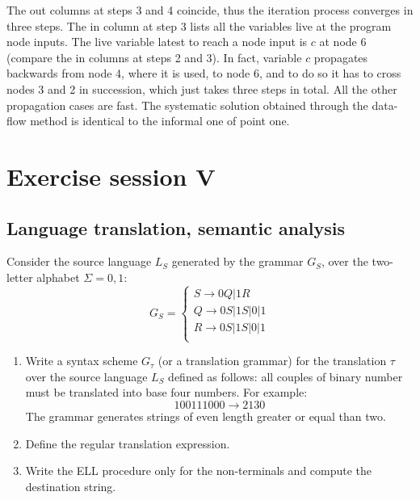 \documentclass[12pt, a4paper]{report}
\begin{document}
\begin{enumerate}
\begin{figure}[H]
                \end{figure} 
                The out columns at steps 3 and 4 coincide, thus the iteration process converges in three steps. The in column at step 3 lists all the variables
                live at the program node inputs. The live variable latest to reach a node input is $c$ at node 6 (compare the in columns at steps 2 and 3). In fact, 
                variable $c$ propagates backwards from node 4, where it is used, to node 6, and to do so it has to cross nodes 3 and 2 in succession, which just takes 
                three steps in total. All the other propagation cases are fast. The systematic solution obtained through the data-flow method is identical to the informal 
                one of point one. 
        \end{enumerate}

\newpage 

\chapter{Exercise session V}
    \section{Language translation, semantic analysis}
        Consider the source language $L_S$ generated by the grammar $G_S$, over the two-letter alphabet $\Sigma= {0,1}$:
        \[G_S=\begin{cases}
            S \rightarrow 0Q|1R     \\
            Q \rightarrow 0S|1S|0|1 \\
            R \rightarrow 0S|1S|0|1 \\
        \end{cases}\]
        \begin{enumerate}
            \item Write a syntax scheme $G_{\tau}$ (or a translation grammar) for the translation $\tau$ over the source language $L_S$ defined as follows: 
                all couples of binary number must be translated into base four numbers. For example: 
                \[100111000 \rightarrow 2130\]
                The grammar generates strings of even length greater or equal than two. 
            \item Define the regular translation expression.
            \item Write the ELL procedure only for the non-terminals and compute the destination string. 
        \end{enumerate}
\end{document}
